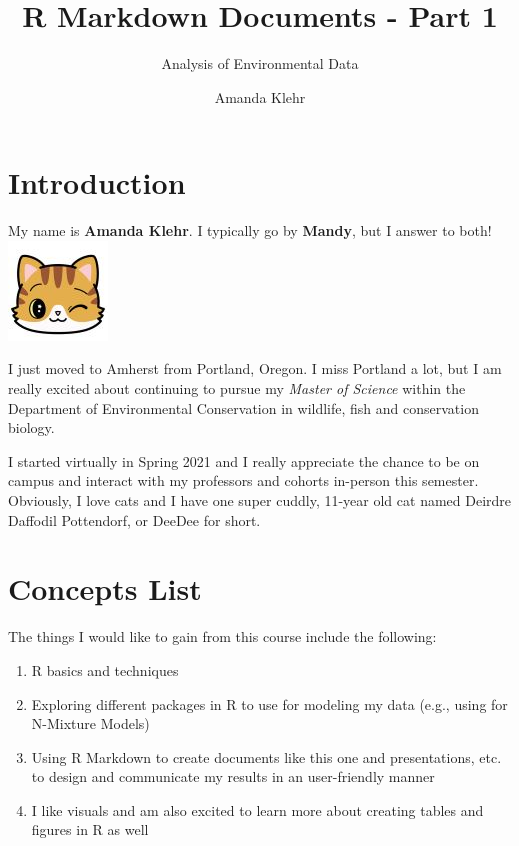 \documentclass[
]{article}
\title{R Markdown Documents - Part 1}
\subtitle{Analysis of Environmental Data}
\author{Amanda Klehr}
\date{}
\providecommand{\tightlist}{%
  \setlength{\itemsep}{0pt}\setlength{\parskip}{0pt}}
\begin{document}
\maketitle

{
\setcounter{tocdepth}{2}
\tableofcontents
}
\hypertarget{introduction}{%
\section{Introduction}\label{introduction}}

My name is \textbf{Amanda Klehr}. I typically go by \textbf{Mandy}, but
I answer to both! \includegraphics{assignments/cat_wink_small.jpg}

I just moved to Amherst from Portland, Oregon. I miss Portland a lot,
but I am really excited about continuing to pursue my \emph{Master of
Science} within the Department of Environmental Conservation in
wildlife, fish and conservation biology.

I started virtually in Spring 2021 and I really appreciate the chance to
be on campus and interact with my professors and cohorts in-person this
semester. Obviously, I love cats and I have one super cuddly, 11-year
old cat named Deirdre Daffodil Pottendorf, or DeeDee for short.

\hypertarget{concepts-list}{%
\section{Concepts List}\label{concepts-list}}

The things I would like to gain from this course include the following:

\begin{enumerate}
\def\labelenumi{\arabic{enumi}.}
\tightlist
\item
  R basics and techniques
\item
  Exploring different packages in R to use for modeling my data (e.g.,
  using for N-Mixture Models)
\item
  Using R Markdown to create documents like this one and presentations,
  etc. to design and communicate my results in an user-friendly manner
\item
  I like visuals and am also excited to learn more about creating tables
  and figures in R as well
\end{enumerate}
\end{document}
